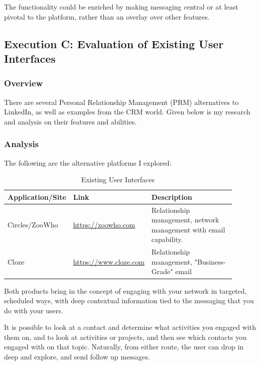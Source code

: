 \documentclass[
	letterpaper, %
]{jdf}
\begin{document}
The functionality could be enriched by making messaging central or at least pivotal to the platform, rather than an overlay over other features.

\subsection{Execution C: Evaluation of Existing User Interfaces}

\subsubsection{Overview}
There are several Personal Relationship Management (PRM) alternatives to LinkedIn, as well as examples from the CRM world. Given below is my research and analysis on their features and abilities.

\subsubsection{Analysis}
The following are the alternative platforms I explored:

\begin{table}[h] %
	\caption{Existing User Interfaces}
	\small %
	\centering %
	\begin{tabular}{L{0.2\linewidth} L{0.25\linewidth} L{0.45\linewidth}}
		\textbf{Application/Site} & \textbf{Link} & \textbf{Description}\\
		\toprule[0.5pt]
		Circles/ZooWho & \url{https://zoowho.com} & Relationship management, network management with email capability.\\
		\midrule
		Cloze & \url{https://www.cloze.com} & Relationship management, "Business-Grade" email\\
		\midrule
	\end{tabular}
\end{table}


Both products bring in the concept of engaging with your network in targeted, scheduled ways, with deep contextual information tied to the messaging that you do with your users.

It is possible to look at a contact and determine what activities you engaged with them on, and to look at activities or projects, and then see which contacts you engaged with on that topic. Naturally, from either route, the user can drop in deep and explore, and send follow up messages.
\end{document}
